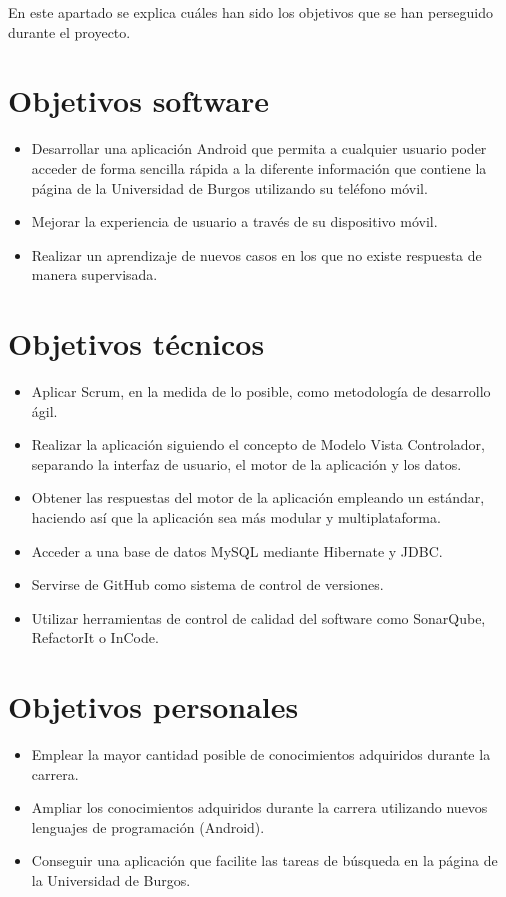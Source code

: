 
En este apartado se explica cuáles han sido los objetivos que se han perseguido durante el proyecto.

\section{Objetivos software}\label{objetivos-software}

\begin{itemize}
	\tightlist
	\item
	Desarrollar una aplicación Android que permita a cualquier usuario poder acceder de forma sencilla rápida a la diferente información que contiene la página de la Universidad de Burgos utilizando su teléfono móvil.
	\item
	Mejorar la experiencia de usuario a través de su dispositivo móvil.
	\item
	Realizar un aprendizaje de nuevos casos en los que no existe respuesta de manera supervisada.
\end{itemize}

\section{Objetivos técnicos}\label{objetivos-tecnicos}

\begin{itemize}
	\tightlist
	\item
	Aplicar Scrum, en la medida de lo posible, como metodología de desarrollo ágil.
	\item
	Realizar la aplicación siguiendo el concepto de Modelo Vista Controlador, separando la interfaz de usuario, el motor de la aplicación y los datos.
	\item
	Obtener las respuestas del motor de la aplicación empleando un estándar, haciendo así que la aplicación sea más modular y multiplataforma.
	\item
	Acceder a una base de datos MySQL mediante Hibernate y JDBC.
	\item
	Servirse de GitHub como sistema de control de versiones.
	\item
	Utilizar herramientas de control de calidad del software como SonarQube, RefactorIt o InCode.
	
\end{itemize}

\section{Objetivos personales}\label{objetivos-personales}

\begin{itemize}
	\tightlist
	\item
	Emplear la mayor cantidad posible de conocimientos adquiridos durante la carrera.
	\item
	Ampliar los conocimientos adquiridos durante la carrera utilizando nuevos lenguajes de programación (Android).
	\item 
	Conseguir una aplicación que facilite las tareas de búsqueda en la página de la Universidad de Burgos.
\end{itemize}
